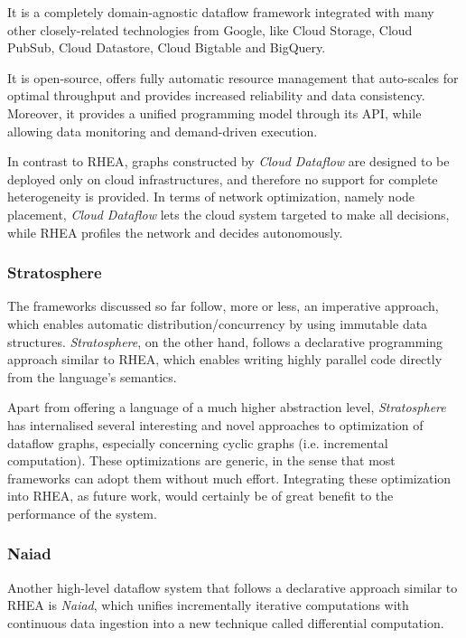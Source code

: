 \documentclass[sigplan,review,anonymous]{acmart}
\begin{document}
It is a completely domain-agnostic dataflow framework integrated with many other
closely-related technologies from Google, like Cloud Storage, Cloud PubSub,
Cloud Datastore, Cloud Bigtable and BigQuery.

It is open-source, offers fully automatic resource management that auto-scales
for optimal throughput and provides increased reliability and data consistency.
Moreover, it provides a unified programming model through its API, while
allowing data monitoring and demand-driven execution.

In contrast to \textsc{RHEA}, graphs constructed by \textit{Cloud Dataflow} are
designed to be deployed only on cloud infrastructures, and therefore no support
for complete heterogeneity is provided. In terms of network optimization, namely
node placement,  \textit{Cloud Dataflow} lets the cloud system targeted to make
all decisions, while \textsc{RHEA} profiles the network and decides
autonomously.

\subsubsection{Stratosphere}

The frameworks discussed so far follow, more or less, an imperative approach,
which enables automatic distribution/concurrency by using immutable data
structures. \textit{Stratosphere}\cite{stratosphere}, on the other hand, follows
a declarative programming approach similar to \textsc{RHEA}, which enables
writing highly parallel code directly from the language's semantics.

Apart from offering a language of a much higher abstraction level,
\textit{Stratosphere} has internalised several interesting and novel approaches
to optimization of dataflow graphs, especially concerning cyclic graphs (i.e.
incremental computation)\cite{spinning}. These optimizations are generic, in the
sense that most frameworks can adopt them without much effort. Integrating these
optimization into \textsc{RHEA}, as future work, would certainly be of great
benefit to the performance of the system.

\subsubsection{Naiad}

Another high-level dataflow system that follows a declarative approach similar
to \textsc{RHEA} is \textit{Naiad}, which unifies incrementally iterative
computations with continuous data ingestion into a new technique called
differential computation.
\end{document}
